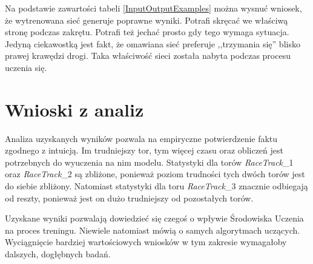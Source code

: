 Na podstawie zawartości tabeli \ref{InputOutputExamples} można wysnuć wniosek, że wytrenowana sieć generuje poprawne wyniki. Potrafi skręcać we właściwą stronę podczas zakrętu. Potrafi też jechać prosto gdy tego wymaga sytuacja. Jedyną ciekawostką jest fakt, że omawiana sieć preferuje ,,trzymania się'' blisko prawej krawędzi drogi. Taka właściwość sieci została nabyta podczas procesu uczenia się.

\vspace{1.5cm}
\section{Wnioski z analiz}
Analiza uzyskanych wyników pozwala na empiryczne potwierdzenie faktu zgodnego z intuicją. Im trudniejszy tor, tym więcej czasu oraz obliczeń jest potrzebnych do wyuczenia na nim modelu. Statystyki dla torów \textit{RaceTrack}\_1 oraz \textit{RaceTrack}\_2 są zbliżone, ponieważ poziom trudności tych dwóch torów jest do siebie zbliżony. Natomiast statystyki dla toru \textit{RaceTrack}\_3 znacznie odbiegają od reszty, ponieważ jest on dużo trudniejszy od pozostałych torów.

Uzyskane wyniki pozwalają dowiedzieć się czegoś o wpływie Środowiska Uczenia na proces treningu. Niewiele natomiast mówią o samych algorytmach uczących. Wyciągnięcie bardziej wartościowych wniosków w tym zakresie wymagałoby dalszych, dogłębnych badań.